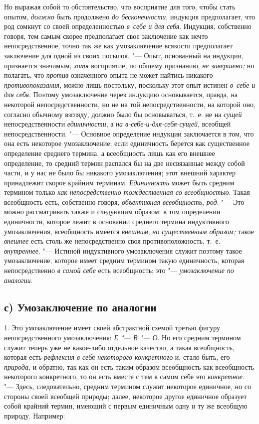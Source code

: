 Но выражая собой то обстоятельство, что восприятие для того,
чтобы стать опытом, {\em должно}
быть продолжено {\em до
бесконечности}, индукция предполагает, что род сомкнут со
своей определенностью {\em в~себе и для
себя}. Индукция, собственно говоря, тем самым скорее
предполагает свое заключение как нечто непосредственное, точно так же как
умозаключение всякости предполагает заключение для одной из своих посылок.
"--- Опыт, основанный на индукции, признается значимым,
{\em хотя} восприятие, по
общему признанию, {\em не завершено;}
но полагать, что
{\em против} означенного
опыта не может найтись никакого
{\em противопоказания},
можно лишь постольку, поскольку этот опыт истинен
{\em в~себе и для себя}.
Поэтому умозаключение через индукцию основывается, правда, на
некоторой непосредственности, но не на той непосредственности, на которой
оно, согласно обычному взгляду, должно было бы основываться, т.~е. не на
{\em сущей}
непосредственности
{\em единичности}, а
{\em на в-себе-и-для-себя-сущей},
всеобщей непосредственности. "--- Основное
определение индукции заключается в том, что она есть некоторое
умозаключение; если единичность берется как существенное определение
среднего термина, а всеобщность лишь как его внешнее определение, то
средний термин распался бы на две несвязанные между собой части, и у нас не
было бы никакого умозаключения; этот внешний характер принадлежит скорое
крайним терминам. {\em Единичность}
может быть средним термином только
{\em как непосредственно тождественная
со всеобщностью}. Такая всеобщность есть, собственно говоря,
{\em объективная всеобщность},
{\em род}. "--- Это можно
рассматривать также и следующим образом: в том определении единичности,
которое лежит в основании среднего термина индуктивного умозаключения,
всеобщность имеется {\em внешним},
{\em но существенным образом;}
такое {\em внешнее}
есть столь же непосредственно своя противоположность, т.~е.
{\em внутреннее}. "---
Истиной индуктивного умозаключения служит поэтому
такое умозаключение, которое имеет средним термином такую
единичность, которая непосредственно
{\em в самой себе} есть
всеобщность; это "--- {\em умозаключение по
аналогии}.

\subsection[с) Умозаключение по аналогии]{с) Умозаключение по аналогии}
1. Это умозаключение имеет своей абстрактной схемой третью
фигуру непосредственного умозаключения:
{\em Е "--- В
"--- О}. Но его средним термином служит теперь
уже не какое-либо отдельное качество, а такая всеобщность, которая есть
{\em рефлексия-в-себя некоторого
конкретного} и, стало быть, его
{\em природа;} и обратно,
так как он есть таким образом всеобщность как всеобщность некоторого
конкретного, то он есть вместе с тем в самом себе это
{\em конкретное}. "---
Здесь, следовательно, средним термином служит некоторое
единичное, но со стороны своей всеобщей природы; далее, некоторое другое
единичное образует собой крайний термин, имеющий с первым единичным одну и
ту же всеобщую природу. Например:

